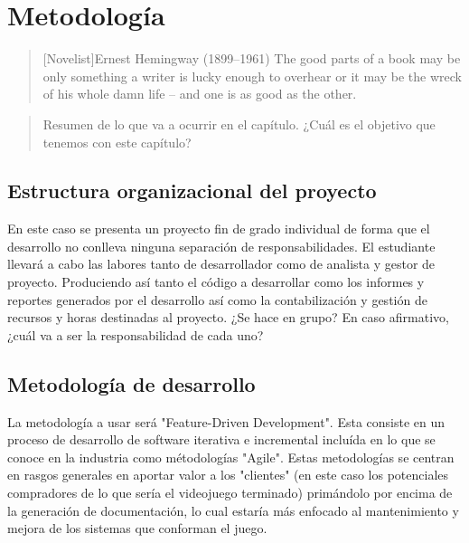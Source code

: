 \chapter{Metodología}

\begin{quotation}[Novelist]{Ernest Hemingway (1899--1961)}
The good parts of a book may be only something a writer is lucky enough to overhear or it may be the wreck of his whole damn life -- and one is as good as the other.
\end{quotation}

\begin{abstract}
Resumen de lo que va a ocurrir en el capítulo. ¿Cuál es el objetivo que tenemos con este capítulo?
\end{abstract}

\section{Estructura organizacional del proyecto}
En este caso se presenta un proyecto fin de grado individual de forma que el desarrollo no conlleva ninguna separación de responsabilidades. El estudiante llevará a cabo las labores tanto de desarrollador como de analista y gestor de proyecto. Produciendo así tanto el código a desarrollar como los informes y reportes generados por el desarrollo así como la contabilización y gestión de recursos y horas destinadas al proyecto.
¿Se hace en grupo? En caso afirmativo, ¿cuál va a ser la responsabilidad de cada uno?

\section{Metodología de desarrollo}
La metodología a usar será "Feature-Driven Development". Esta consiste en un proceso de desarrollo de software iterativa e incremental incluída en lo que se conoce en la industria como métodologías "Agile".
Estas metodologías se centran en rasgos generales en aportar valor a los "clientes" (en este caso los potenciales compradores de lo que sería el videojuego terminado) primándolo por encima de la generación de documentación, lo cual estaría más enfocado al mantenimiento y mejora de los sistemas que conforman el juego.

